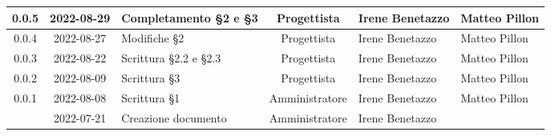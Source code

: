 \begin{center}
\begin{longtable}{ |c|c|p{8em}|c|m{5em}|m{6em}| }
	\hline
	0.0.5 & 2022-08-29 & Completamento §2 e §3 & Progettista & Irene \newline Benetazzo & Matteo \newline Pillon\\ 
	\hline
	0.0.4 & 2022-08-27 & Modifiche §2 & Progettista & Irene \newline Benetazzo & Matteo \newline Pillon \\ 
	\hline
	0.0.3 & 2022-08-22 & Scrittura §2.2 e §2.3 & Progettista & Irene \newline Benetazzo & Matteo Pillon\\ 
	\hline
    0.0.2 & 2022-08-09 & Scrittura §3 & Progettista & Irene \newline Benetazzo & Matteo \newline Pillon \\ 
	\hline
	0.0.1 & 2022-08-08 & Scrittura §1 & Amministratore & Irene \newline Benetazzo & Matteo Pillon\\ 
	\hline
	& 2022-07-21 & Creazione documento & Amministratore & Irene \newline Benetazzo & \\ 
	\hline
	\end{longtable}
	\end{center}
	\newpage